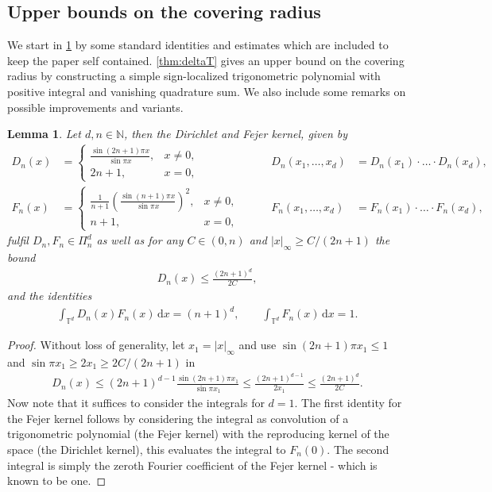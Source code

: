 \documentclass[11pt,a4paper,twoside,final,biblatex]{scrartcl}
\newcommand{\N}{\ensuremath{\mathbb{N}}}
\newcommand{\T}{\ensuremath{\mathbb{T}}}
\renewcommand{\d}{\,\mathrm{d}}
\newtheorem{lemma}[theorem]{Lemma}
\theoremstyle{definition}
\numberwithin{equation}{section}
\numberwithin{table}{section}
\numberwithin{figure}{section}
\begin{document}
\subsection{Upper bounds on the covering radius}
We start in \cref{lem:DFn} by some standard identities and estimates which are included to keep the paper self contained.
\cref{thm:deltaT} gives an upper bound on the covering radius by constructing a simple sign-localized trigonometric polynomial with positive integral and vanishing quadrature sum.
We also include some remarks on possible improvements and variants.
\begin{lemma}\label{lem:DFn}
    Let $d,n\in\N$, then the Dirichlet and Fejer kernel, given by
    \begin{align*}
        D_n(x)&=\begin{cases}\frac{\sin(2n+1)\pi x}{\sin\pi x}, & x\ne 0,\\
                2n+1, & x=0,\end{cases}\qquad
        &D_n(x_1,\hdots,x_d)&=D_n(x_1)\cdot\hdots\cdot D_n(x_d),\\
        F_n(x)&=\begin{cases}
           \frac{1}{n+1}\left(\frac{\sin(n+1)\pi x}{\sin\pi x}\right)^2, & x\ne 0,\\
           n+1, & x=0,\end{cases}\qquad
        &F_n(x_1,\hdots,x_d)&=F_n(x_1)\cdot\hdots\cdot F_n(x_d),
    \end{align*}
    fulfil $D_n,F_n\in\Pi_n^d$ as well as for any $C\in (0,n)$ and $|x|_\infty\ge C/(2n+1)$ the bound
    \begin{align*}
     D_n(x)\le \frac{(2n+1)^{d}}{2C},
    \end{align*}
    and the identities
    \begin{align*}
      \int_{\T^d} D_n(x) F_n(x) \d x=(n+1)^d, \qquad \int_{\T^d} F_n(x)\d x = 1.
    \end{align*}
\end{lemma}
\begin{proof}
 Without loss of generality, let $x_1=|x|_{\infty}$ and use $\sin(2n+1)\pi x_1\le 1$ and $\sin\pi x_1\ge 2x_1\ge 2C/(2n+1)$ in
 \begin{align*}
  D_n(x)\le (2n+1)^{d-1}\frac{\sin(2n+1)\pi x_1}{\sin\pi x_1}
        \le \frac{(2n+1)^{d-1}}{2 x_1}
        \le \frac{(2n+1)^d}{2 C}.
    \end{align*}
 Now note that it suffices to consider the integrals for $d=1$.
 The first identity for the Fejer kernel follows by considering the integral as convolution of a trigonometric polynomial (the Fejer kernel) with the reproducing kernel of the space (the Dirichlet kernel), this evaluates the integral to $F_n(0)$.
 The second integral is simply the zeroth Fourier coefficient of the Fejer kernel - which is known to be one.
\end{proof}
\end{document}
